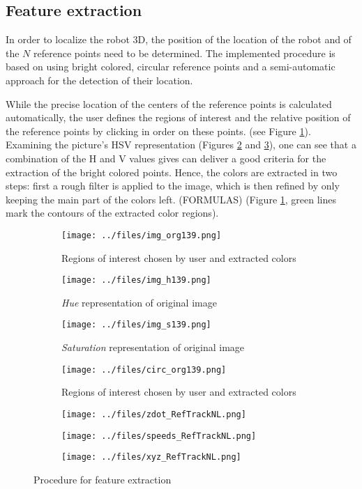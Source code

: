 \subsection{Feature extraction}

In order to localize the robot 3D, the position of the location of the robot and of the $N$ reference points need to be determined. The implemented procedure is based on using bright colored, circular reference points and a semi-automatic approach for the detection of their location. 

While the precise location of the centers of the reference points is calculated automatically, the user defines the regions of interest and the relative position of the reference points by clicking in order on these points. (see Figure \ref{feat_step0}). Examining the picture's HSV representation (Figures \ref{feat_step1} and \ref{feat_step2}), one can see that a combination of the H and V values gives can deliver a good criteria for the extraction of the bright colored points. Hence, the colors are extracted in two steps: first a rough filter is applied to the image, which is then refined by only keeping the main part of the colors left. (FORMULAS) (Figure \ref{feat_step0}, green lines mark the contours of the extracted color regions).




\begin{figure}[H]
	\centering
	\begin{subfigure}[b]{0.49\linewidth}
		\texttt{[image: ../files/img\_org139.png]}
		\caption{Regions of interest chosen by user and extracted colors}
		\label{feat_step0}
	\end{subfigure}
	\begin{subfigure}[b]{0.49\linewidth}
		\texttt{[image: ../files/img\_h139.png]}
		\caption{\textit{Hue} representation of original image}
		\label{feat_step1}
	\end{subfigure}
	\begin{subfigure}[b]{0.49\linewidth}
		\texttt{[image: ../files/img\_s139.png]}
		\caption{\textit{Saturation} representation of original image}
		\label{feat_step2}
	\end{subfigure}
	\begin{subfigure}[b]{0.49\linewidth}
		\texttt{[image: ../files/circ\_org139.png]}
		\caption{Regions of interest chosen by user and extracted colors}
		\label{feat_step3}
	\end{subfigure}
	
	
	\begin{subfigure}[b]{0.49\linewidth}
		\texttt{[image: ../files/zdot\_RefTrackNL.png]}
	\end{subfigure}
	\begin{subfigure}[b]{0.49\linewidth}
		\texttt{[image: ../files/speeds\_RefTrackNL.png]}
	\end{subfigure}
	\begin{subfigure}[b]{0.49\linewidth}
		\texttt{[image: ../files/xyz\_RefTrackNL.png]}
	\end{subfigure}
	\caption{Procedure for feature extraction} 
	\label{features}
\end{figure}


